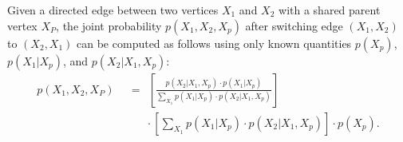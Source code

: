 
\begin{lemma}\label{sharedparent}
Given a directed edge between two vertices $X_{1}$ and $X_{2}$ with a shared parent vertex $X_{P}$, the joint probability $p(X_{1}, X_{2}, X_{p})$ after switching edge $(X_{1}, X_{2})$ to $(X_{2},X_{1})$ can be computed as follows using only known quantities $p(X_{p})$,  $p(X_{1}|X_{p})$, and \newline $p(X_{2}|X_{1},X_{p})$:
\begin{align*}
	p(X_{1},X_{2},X_{P}) & \ \ = \ \ 	[\frac{   p(X_{2}|X_{1},X_{p}) \cdot p(X_{1}|X_{p})   }{  \sum_{X_{1}} p(X_{1}|X_{p})\cdot p(X_{2}|X_{1},X_{p})  }  ] \\[1em] 
				& \quad \quad  \cdot [\sum_{X_{1}} p(X_{1}|X_{p})\cdot p(X_{2}|X_{1},X_{p})] \cdot p(X_{p}).
\end{align*}
\end{lemma}


\begin{figure}[h!]
\begin{center}
\begin{minipage}[t]{0.35\textwidth}
\begin{center}
\end{center}
\end{minipage}
~
\begin{minipage}[t]{0.1\textwidth}
\begin{center}
\vspace{-7em}
\scalebox{1.5}{$\implies$} 
\end{center}
\end{minipage}
~
\begin{minipage}[t]{0.35\textwidth}
\begin{center}
\end{center}
\end{minipage}
\end{center}
\caption{}
\end{figure}

